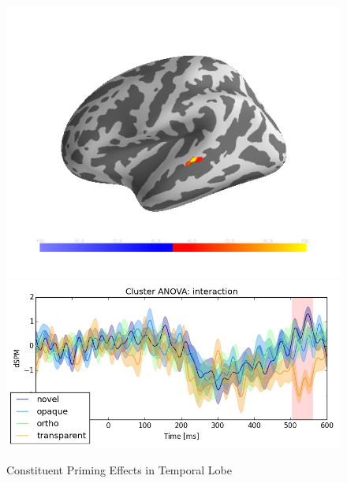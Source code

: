 \documentclass{frontiersSCNS}
\begin{document}
\begin{figure}
\begin{centering}
\includegraphics[scale=0.33]{images/target_brain_inter_analysis}\includegraphics[scale=0.33]{images/target_anova_inter_analysis}
\par\end{centering}
\caption{\label{fig:priming_targets} Constituent Priming Effects in Temporal Lobe}
\end{figure}
\end{document}
